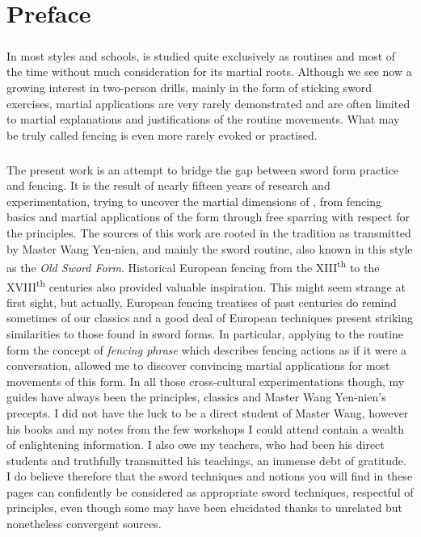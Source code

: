 \chapter{Preface}

\paragraph*{}
In most styles and schools, \Taijijian{} is studied quite exclusively as routines and most of the time without much consideration for its martial roots. 
Although we see now a growing interest in two-person drills, mainly in the form of sticking sword exercises, martial applications are very rarely demonstrated and are often limited to martial explanations and justifications of the routine movements. 
What may be truly called \Taijijian{} fencing is even more rarely evoked or practised.

\paragraph*{}
The present work is an attempt to bridge the gap between \Taiji{} sword form practice and \Taijijian{} fencing.
It is the result of nearly fifteen years of research and experimentation,
trying to uncover the martial dimensions of \Taijijian{}, from fencing basics and martial applications of the form through free sparring with respect for the \Taiji{} principles.
The sources of this work are rooted in the \Yangjia{} \Michuan{} \Taijijian{} tradition as transmitted by Master
Wang Yen-nien, and mainly the \Kunlun{} sword routine, also known in
this style as the \emph{Old Sword Form}.
Historical European fencing from the XIII\textsuperscript{th} to the XVIII\textsuperscript{th} centuries also provided valuable inspiration.
This might seem strange at first sight, but actually, European fencing treatises of past centuries do remind sometimes of our \Taiji{} classics and a good deal of European techniques present striking similarities to those found in \Taiji{} sword forms.
In particular, applying to the \Kunlun{} routine form the
concept of \emph{fencing phrase} which describes fencing actions as if
it were a conversation, allowed me to discover convincing martial
applications for most movements of this form.
In all those cross-cultural experimentations though, my guides have always been the \Taiji{} principles, \Taiji{} classics and Master Wang Yen-nien's precepts.
I did not have the luck to be a direct student of Master Wang, however his
books and my notes from the few workshops I could attend contain a
wealth of enlightening information.
I also owe my teachers, who had been his direct students and truthfully transmitted his teachings, an immense debt of gratitude.
I do believe therefore that the sword techniques and notions you will find in these pages can confidently be considered as appropriate \Taiji{} sword techniques, respectful of principles, even though some may have been elucidated thanks to unrelated but nonetheless convergent sources.

